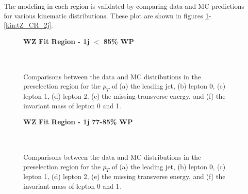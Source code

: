 The modeling in each region is validated by comparing data and MC predictions for various kinematic distributions. These plot are shown in figures \ref{kin:WP_1j_not85}-\ref{kin:tZ_CR_2j}.

\begin{figure}[H]
    \centering
    \textbf{WZ Fit Region - 1j $<$ 85\% WP}\\
    \\
    \\
    \caption{Comparisons between the data and MC distributions in the preselection region for the $p_T$ of (a) the leading jet, (b) lepton 0, (c) lepton 1, (d) lepton 2, (e) the missing transverse energy, and (f) the invariant mass of lepton 0 and 1.}
    \label{kin:WP_1j_not85}
\end{figure}

\begin{figure}[H]
    \centering
    \textbf{WZ Fit Region - 1j 77-85\% WP}\\
    \\
    \\
    \caption{Comparisons between the data and MC distributions in the preselection region for the $p_T$ of (a) the leading jet, (b) lepton 0, (c) lepton 1, (d) lepton 2, (e) the missing transverse energy, and (f) the invariant mass of lepton 0 and 1.}
    \label{kin:WP_1j_77_85}
\end{figure}

